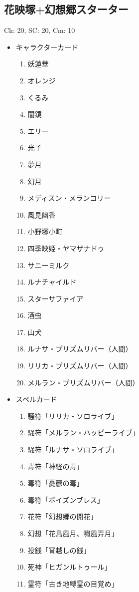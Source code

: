 \documentclass[line_length=22zw,number_of_lines=45,twocolumn]{jlreq}
\begin{document}
\subsection{花映塚+幻想郷スターター}
Ch: 20, SC: 20, Cm: 10
\begin{itemize}
	\item キャラクターカード
		\begin{enumerate}
			\item 妖蓮華
			\item オレンジ
			\item くるみ
			\item 闇鏡
			\item エリー
			\item 光子
			\item 夢月
			\item 幻月
			\item メディスン・メランコリー
			\item 風見幽香
			\item 小野塚小町
			\item 四季映姫・ヤマザナドゥ
			\item サニーミルク
			\item ルナチャイルド
			\item スターサファイア
			\item 酒虫
			\item 山犬
			\item ルナサ・プリズムリバー（人間）
			\item リリカ・プリズムリバー（人間）
			\item メルラン・プリズムリバー（人間）
		\end{enumerate}
	\item スペルカード
		\begin{enumerate}
			\item 騒符「リリカ・ソロライブ」
			\item 騒符「メルラン・ハッピーライブ」
			\item 騒符「ルナサ・ソロライブ」
			\item 毒符「神経の毒」
			\item 毒符「憂鬱の毒」
			\item 毒符「ポイズンブレス」
			\item 花符「幻想郷の開花」
			\item 幻想「花鳥風月、嘯風弄月」
			\item 投銭「宵越しの銭」
			\item 死神「ヒガンルトゥール」
			\item 霊符「古き地縛霊の目覚め」

\end{enumerate}
\end{itemize}
\end{document}
